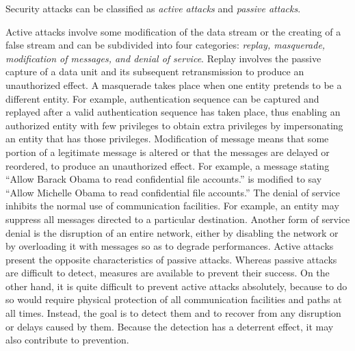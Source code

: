 	Security attacks can be classified as \textit{active attacks} and \textit{passive attacks}.
	
	Active attacks involve some modification of the data stream or the creating of a false stream and can be subdivided into four categories: \textit{replay, masquerade, modification of messages, and denial of service}.
	Replay involves the passive capture of a data unit and its subsequent retransmission to produce an unauthorized effect.
	A masquerade takes place when one entity pretends to be a different entity.
	For example, authentication sequence can be captured and replayed after a valid authentication sequence has taken place, thus enabling an authorized entity with few privileges to obtain extra privileges by impersonating an entity that has those privileges.
	Modification of message means that some portion of a legitimate message is altered or that the messages are delayed or reordered, to produce an unauthorized effect.
	For example, a message stating ``Allow Barack Obama to read confidential file accounts.'' is modified to say ``Allow Michelle Obama to read confidential file accounts.''
	The denial of service inhibits the normal use of communication facilities.
	For example, an entity may suppress all messages directed to a particular destination.
	Another form of service denial is the disruption of an entire network, either by disabling the network or by overloading it with messages so as to degrade performances.
	Active attacks present the opposite characteristics of passive attacks.
	Whereas passive attacks are difficult to detect, measures are available to prevent their success.
	On the other hand, it is quite difficult to prevent active attacks absolutely, because to do so would require physical protection of all communication facilities and paths at all times.
	Instead, the goal is to detect them and to recover from any disruption or delays caused by them.
	Because the detection has a deterrent effect, it may also contribute to prevention.
	
